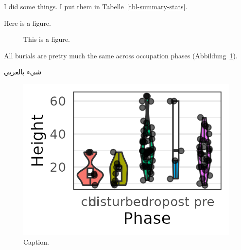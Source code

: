 \documentclass[
  letterpaper,
  DIV=11,
  numbers=noendperiod]{scrartcl}
\begin{document}
I did some things. I put them in Tabelle~\ref{tbl-summary-stats}.

Here is a figure.

\begin{figure}


\caption{\label{fig-boxplot}This is a figure.}

\end{figure}%

All burials are pretty much the same across occupation phases
(Abbildung~\ref{fig-boxplot}).

شيء بالعربي

\begin{figure}[H]

{\centering \includegraphics{figures/phase-height-boxplot.png}

}

\caption{Caption.}

\end{figure}%
\end{document}
